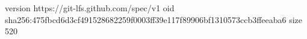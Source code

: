 version https://git-lfs.github.com/spec/v1
oid sha256:475fbcd6d3cf491528682259f0003ff39e117f89906bf1310573ccb3ffeeaba6
size 520
